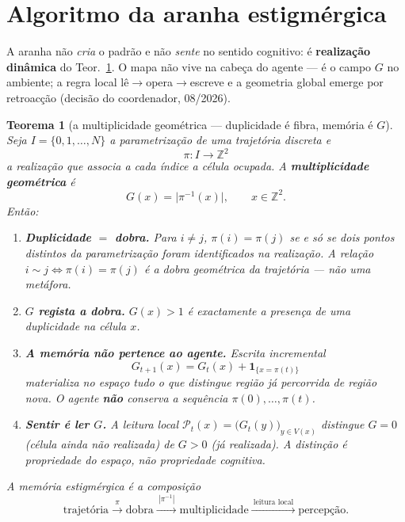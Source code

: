 \documentclass[11pt,a4paper]{article}
\newcommand{\Z}{\ensuremath{\mathbb{Z}}}
\newtheorem{teorema}{Teorema}
\begin{document}

\section{Algoritmo da aranha estigmérgica}\label{sec:aranha}

\noindent A aranha não \emph{cria} o padrão e não \emph{sente} no sentido cognitivo:
é \textbf{realização dinâmica} do Teor.~\ref{thm:multiplicidade}. O mapa não vive
na cabeça do agente --- é o campo $G$ no ambiente; a regra local
lê$\to$opera$\to$escreve e a geometria global emerge por retroacção
(decisão do coordenador, 08/2026).

\begin{teorema}[a multiplicidade geométrica --- duplicidade é fibra, memória é $G$]\label{thm:multiplicidade}
Seja $I=\{0,1,\ldots,N\}$ a parametrização de uma trajetória discreta e
\[
\pi\colon I\longrightarrow\Z^{2}
\]
a realização que associa a cada índice a célula ocupada. A
\textbf{multiplicidade geométrica} é
\[
G(x)=\bigl|\pi^{-1}(x)\bigr|,\qquad x\in\Z^{2}.
\]
Então:
\begin{enumerate}\itemsep2pt
\item \textbf{Duplicidade $=$ dobra.} Para $i\neq j$, $\pi(i)=\pi(j)$ se e
      só se dois pontos distintos da parametrização foram identificados na
      realização. A relação $i\sim j\iff\pi(i)=\pi(j)$ \emph{é} a dobra
      geométrica da trajetória --- não uma metáfora.
\item \textbf{$G$ regista a dobra.} $G(x)>1$ é exactamente a presença de
      uma duplicidade na célula $x$.
\item \textbf{A memória não pertence ao agente.} Escrita incremental
      \[
      G_{t+1}(x)=G_{t}(x)+\mathbf{1}_{\{x=\pi(t)\}}
      \]
      materializa no espaço tudo o que distingue região já percorrida de
      região nova. O agente \textbf{não} conserva a sequência
      $\pi(0),\ldots,\pi(t)$.
\item \textbf{Sentir é ler $G$.} A leitura local
      $\mathcal{P}_{t}(x)=\bigl(G_{t}(y)\bigr)_{y\in V(x)}$ distingue
      $G=0$ (célula ainda não realizada) de $G>0$ (já realizada). A
      distinção é propriedade do espaço, não propriedade cognitiva.
\end{enumerate}
A memória estigmérgica é a composição
\[
\boxed{
\text{trajetória}
\xrightarrow{\ \pi\ }
\text{dobra}
\xrightarrow{\ |\pi^{-1}|\ }
\text{multiplicidade}
\xrightarrow{\ \text{leitura local}\ }
\text{percepção}.
}
\]
\end{teorema}
\end{document}
